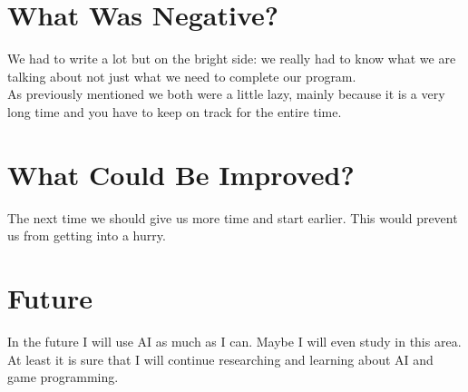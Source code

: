 \section*{What Was Negative?}
We had to write a lot but on the bright side: we really had to know what we are talking about not just what we need to complete our program.\medskip\\
As previously mentioned we both were a little lazy, mainly because it is a very long time and you have to keep on track for the entire time.

\section*{What Could Be Improved?}
The next time we should give us more time and start earlier. This would prevent us from getting into a hurry.

\section*{Future}
In the future I will use AI as much as I can. Maybe I will even study in this area. At least it is sure that I will continue researching and learning about AI and game programming.


